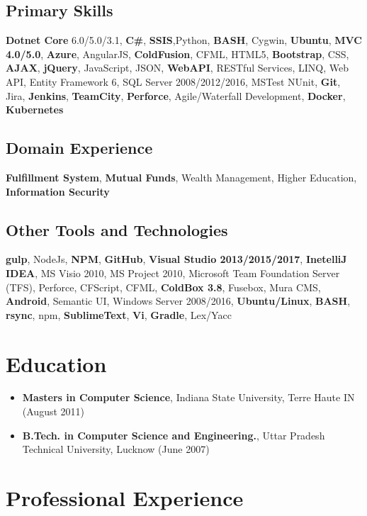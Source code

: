 \documentclass[letterpaper,11pt]{article}
\begin{document}
\subsection{Primary Skills}
\textbf{Dotnet Core} 6.0/5.0/3.1, \textbf{C\#}, \textbf{SSIS},Python, \textbf{BASH}, Cygwin, \textbf{Ubuntu}, \textbf{MVC 4.0/5.0}, \textbf{Azure}, AngularJS, \textbf{ColdFusion}, CFML, HTML5, \textbf{Bootstrap}, CSS, \textbf{AJAX}, \textbf{jQuery}, JavaScript, JSON, \textbf{WebAPI}, RESTful Services, LINQ, Web API, Entity Framework 6, SQL Server 2008/2012/2016, MSTest NUnit, \textbf{Git}, Jira, \textbf{Jenkins}, \textbf{TeamCity}, \textbf{Perforce}, Agile/Waterfall Development, \textbf{Docker}, \textbf{Kubernetes}

\subsection{Domain Experience}
\textbf{Fulfillment System}, \textbf{Mutual Funds}, Wealth Management, Higher Education, \textbf{Information Security}

\subsection{Other Tools and Technologies}
\textbf{gulp}, NodeJs, \textbf{NPM}, \textbf{GitHub}, \textbf{Visual Studio 2013/2015/2017}, \textbf{InetelliJ IDEA}, MS Visio 2010, MS Project 2010, Microsoft Team Foundation Server (TFS), Perforce, CFScript, CFML, \textbf{ColdBox 3.8}, Fusebox, Mura CMS, \textbf{Android}, Semantic UI, Windows Server 2008/2016, \textbf{Ubuntu/Linux}, \textbf{BASH}, \textbf{rsync}, npm, \textbf{SublimeText}, \textbf{Vi}, \textbf{Gradle}, Lex/Yacc

\section{Education}
\begin{itemize}
    \item \textbf{Masters in Computer Science}, Indiana State University, Terre Haute IN (August 2011)
    \item \textbf{B.Tech. in Computer Science and Engineering.}, Uttar Pradesh Technical University, Lucknow (June 2007)
\end{itemize}

\section{Professional Experience}
\end{document}

